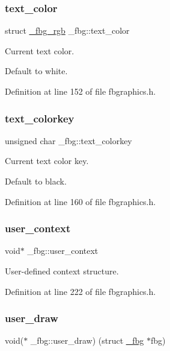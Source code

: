 \subsubsection{\texorpdfstring{text\+\_\+color}{text\_color}}
{\footnotesize\ttfamily struct \mbox{\hyperlink{fbgraphics_8h_struct__fbg__rgb}{\+\_\+fbg\+\_\+rgb}} \+\_\+fbg\+::text\+\_\+color}



Current text color. 

Default to white. 

Definition at line 152 of file fbgraphics.\+h.

\mbox{\label{struct__fbg_a06e65293cf0b48e70d76d63f5de453e6}} 
\subsubsection{\texorpdfstring{text\+\_\+colorkey}{text\_colorkey}}
{\footnotesize\ttfamily unsigned char \+\_\+fbg\+::text\+\_\+colorkey}



Current text color key. 

Default to black. 

Definition at line 160 of file fbgraphics.\+h.

\mbox{\label{struct__fbg_ae3ecac18abee9dedabacaca9bb063bde}} 
\subsubsection{\texorpdfstring{user\+\_\+context}{user\_context}}
{\footnotesize\ttfamily void$\ast$ \+\_\+fbg\+::user\+\_\+context}



User-\/defined context structure. 



Definition at line 222 of file fbgraphics.\+h.

\mbox{\label{struct__fbg_ac66a762877982c6f381a7cfd54a8f17e}} 
\subsubsection{\texorpdfstring{user\+\_\+draw}{user\_draw}}
{\footnotesize\ttfamily void($\ast$ \+\_\+fbg\+::user\+\_\+draw) (struct \mbox{\hyperlink{struct__fbg}{\+\_\+fbg}} $\ast$fbg)}



